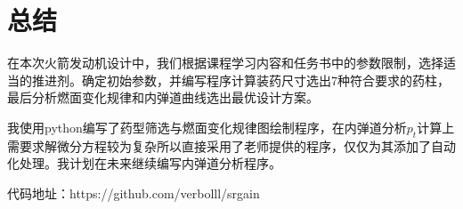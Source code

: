 
\chapter{总结}

在本次火箭发动机设计中，我们根据课程学习内容和任务书中的参数限制，选择适当的推进剂。确定初始参数，并编写程序计算装药尺寸选出7种符合要求的药柱，最后分析燃面变化规律和内弹道曲线选出最优设计方案。

我使用python编写了药型筛选与燃面变化规律图绘制程序，在内弹道分析$p_{t}$计算上需要求解微分方程较为复杂所以直接采用了老师提供的程序，仅仅为其添加了自动化处理。我计划在未来继续编写内弹道分析程序。

代码地址：https://github.com/verbolll/srgain